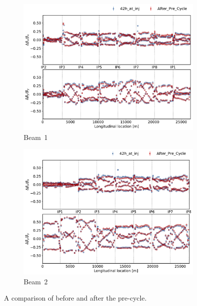 \documentclass[a4paper]{cernatsnote}
\begin{document}
\begin{figure}[ht]
\begin{subfigure}{.5\textwidth}
  \centering
  \includegraphics[width=.8\linewidth]{plots/beam1/beta_beat_before_after_pre_beam1.pdf}  
  \caption{Beam~1}
\end{subfigure}
\begin{subfigure}{.5\textwidth}
  \centering
  \includegraphics[width=.8\linewidth]{plots/beam2/beta_beat_before_after_pre_beam2.pdf}  
  \caption{Beam~2}
\end{subfigure}
\caption{A comparison of before and after the pre-cycle.}
\label{fig:before_after_pre_cycle}
\end{figure}
\end{document}
